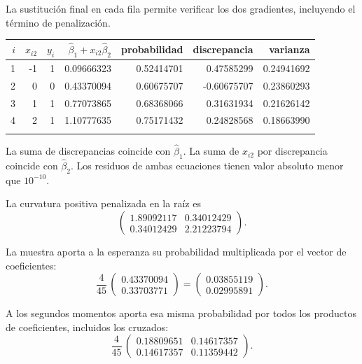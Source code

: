 \documentclass[11pt,a4paper]{article}
\begin{document}
La sustitución final en cada fila permite verificar
los dos gradientes, incluyendo el término de penalización.
\begin{center}\scriptsize
\begin{tabular}{rrrrrrr}\toprule
\(i\)&\(x_{i2}\)&\(y_i\)&\(\widehat\beta_1+x_{i2}\widehat\beta_2\)&probabilidad&discrepancia&varianza\\\midrule
1&-1&1&0.09666323&0.52414701&0.47585299&0.24941692\\
2&0&0&0.43370094&0.60675707&-0.60675707&0.23860293\\
3&1&1&0.77073865&0.68368066&0.31631934&0.21626142\\
4&2&1&1.10777635&0.75171432&0.24828568&0.18663990\\
\\\bottomrule\end{tabular}\end{center}
La suma de discrepancias coincide con \(\widehat\beta_1\).
La suma de \(x_{i2}\) por discrepancia coincide con
\(\widehat\beta_2\). Los residuos de ambas ecuaciones
tienen valor absoluto menor que \(10^{-10}\).

La curvatura positiva penalizada en la raíz es
\[
\begin{pmatrix}1.89092117&0.34012429\\0.34012429&2.21223794\end{pmatrix}.
\]

La muestra aporta a la esperanza su probabilidad
multiplicada por el vector de coeficientes:
\[
\frac{4}{45}\,\begin{pmatrix}0.43370094\\0.33703771\end{pmatrix}=\begin{pmatrix}0.03855119\\0.02995891\end{pmatrix}.
\]

A los segundos momentos aporta esa misma probabilidad
por todos los productos de coeficientes, incluidos los cruzados:
\[
\frac{4}{45}\,\begin{pmatrix}0.18809651&0.14617357\\0.14617357&0.11359442\end{pmatrix}.
\]
\end{document}
